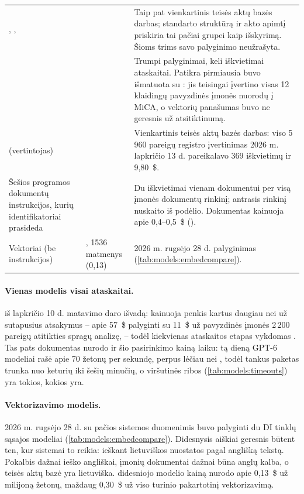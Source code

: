 \begin{xltabular}{\textwidth}{@{}L{36mm}L{40mm}Y@{}}
, ,  &  & Taip pat vienkartinis teisės aktų bazės darbas;  standarto struktūrą ir akto apimtį priskiria tai pačiai grupei kaip išskyrimą. Šioms trims savo palyginimo neužrašyta. \\
 &  & Trumpi palyginimai, keli iškvietimai ataskaitai. Patikra pirmiausia buvo išmatuota su : jis teisingai įvertino visas 12 klaidingų pavyzdinės įmonės nuorodų į MiCA, o vektorių panašumas buvo ne geresnis už atsitiktinumą. \\
 (vertintojas) &  & Vienkartinis teisės aktų bazės darbas: viso 5\,960 pareigų registro įvertinimas 2026 m. lapkričio 13 d. pareikalavo 369 iškvietimų ir 9,80~\$. \\
Šešios programos dokumentų instrukcijos, kurių identifikatoriai prasideda  &  & Du iškvietimai vienam dokumentui per visą įmonės dokumentų rinkinį; antrasis rinkinį nuskaito iš podėlio. Dokumentas kainuoja apie 0,4--0,5~\$ (). \\
Vektoriai (be instrukcijos) & , 1536 matmenys (0,13) & 2026 m. rugsėjo 28 d. palyginimas (\cref{tab:models:embedcompare}). \\
\end{xltabular}

\paragraph{Vienas modelis visai ataskaitai.}  iš lapkričio 10 d.
matavimo daro išvadą:  kainuoja penkis kartus daugiau nei
 už sutapusius atsakymus -- apie 57~\$ palyginti su 11~\$ už pavyzdinės
įmonės 2\,200 pareigų atitikties spragų analizę, -- todėl kiekvienas ataskaitos etapas
vykdomas . Tas pats dokumentas nurodo ir šio pasirinkimo kainą laiku: tą
dieną GPT-6 modeliai rašė apie 70 žetonų per sekundę, perpus lėčiau nei
, todėl tankus paketas trunka nuo keturių iki šešių minučių, o
viršutinės ribos (\cref{tab:models:timeouts}) yra tokios, kokios yra.

\paragraph{Vektorizavimo modelis.} 2026 m. rugsėjo 28 d. su pačios sistemos duomenimis buvo
palyginti du DI tinklų sąsajos modeliai (\cref{tab:models:embedcompare}). Didesnysis aiškiai
geresnis būtent ten, kur sistemai to reikia: ieškant lietuviškos nuostatos pagal anglišką tekstą.
Pokalbis dažnai ieško angliškai, įmonių dokumentai dažnai būna anglų kalba, o teisės aktų
bazė yra lietuviška.  didesniojo modelio kainą nurodo apie
0,13~\$ už milijoną žetonų, maždaug 0,30~\$ už viso turinio pakartotinį vektorizavimą.

